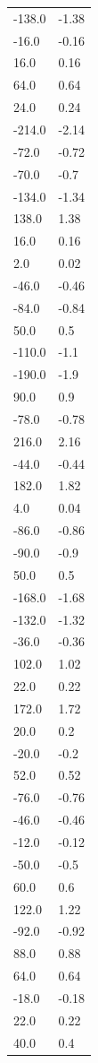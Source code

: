 \begin{longtable}{ll}
-138.0 & -1.38 \\
-16.0 & -0.16 \\
16.0 & 0.16 \\
64.0 & 0.64 \\
24.0 & 0.24 \\
-214.0 & -2.14 \\
-72.0 & -0.72 \\
-70.0 & -0.7 \\
-134.0 & -1.34 \\
138.0 & 1.38 \\
16.0 & 0.16 \\
2.0 & 0.02 \\
-46.0 & -0.46 \\
-84.0 & -0.84 \\
50.0 & 0.5 \\
-110.0 & -1.1 \\
-190.0 & -1.9 \\
90.0 & 0.9 \\
-78.0 & -0.78 \\
216.0 & 2.16 \\
-44.0 & -0.44 \\
182.0 & 1.82 \\
4.0 & 0.04 \\
-86.0 & -0.86 \\
-90.0 & -0.9 \\
50.0 & 0.5 \\
-168.0 & -1.68 \\
-132.0 & -1.32 \\
-36.0 & -0.36 \\
102.0 & 1.02 \\
22.0 & 0.22 \\
172.0 & 1.72 \\
20.0 & 0.2 \\
-20.0 & -0.2 \\
52.0 & 0.52 \\
-76.0 & -0.76 \\
-46.0 & -0.46 \\
-12.0 & -0.12 \\
-50.0 & -0.5 \\
60.0 & 0.6 \\
122.0 & 1.22 \\
-92.0 & -0.92 \\
88.0 & 0.88 \\
64.0 & 0.64 \\
-18.0 & -0.18 \\
22.0 & 0.22 \\
40.0 & 0.4 \\

\end{longtable}
